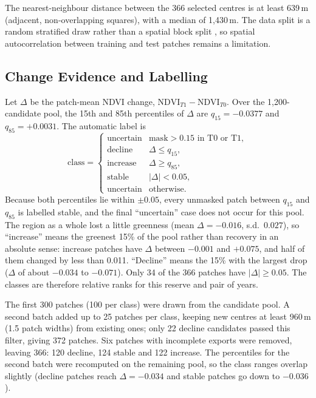\documentclass[11pt]{article}
\begin{document}
The nearest-neighbour distance between the 366 selected centres is at
least 639\,m (adjacent, non-overlapping squares), with a median of
1,430\,m. The data split is a random stratified draw rather than a
spatial block split \citep{ploton2020}, so spatial autocorrelation
between training and test patches remains a limitation.

\subsection{Change Evidence and Labelling}

Let $\Delta$ be the patch-mean NDVI change,
$\mathrm{NDVI}_{T1} - \mathrm{NDVI}_{T0}$. Over the 1,200-candidate
pool, the 15th and 85th percentiles of $\Delta$ are $q_{15} = -0.0377$
and $q_{85} = +0.0031$. The automatic label is
\begin{equation}
\mathrm{class} =
\begin{cases}
\text{uncertain} & \text{mask} > 0.15 \text{ in T0 or T1},\\
\text{decline} & \Delta \le q_{15},\\
\text{increase} & \Delta \ge q_{85},\\
\text{stable} & |\Delta| < 0.05,\\
\text{uncertain} & \text{otherwise}.
\end{cases}
\end{equation}
Because both percentiles lie within $\pm 0.05$, every unmasked patch
between $q_{15}$ and $q_{85}$ is labelled stable, and the final
``uncertain'' case does not occur for this pool. The region as a whole
lost a little greenness (mean $\Delta = -0.016$, s.d.\ $0.027$), so
``increase'' means the greenest 15\% of the pool rather than recovery in
an absolute sense: increase patches have $\Delta$ between $-0.001$ and
$+0.075$, and half of them changed by less than 0.011. ``Decline''
means the 15\% with the largest drop ($\Delta$ of about $-0.034$ to
$-0.071$). Only 34 of the 366 patches have $|\Delta| \ge 0.05$. The
classes are therefore relative ranks for this reserve and pair of
years.

The first 300 patches (100 per class) were drawn from the candidate
pool. A second batch added up to 25 patches per class, keeping new
centres at least 960\,m (1.5 patch widths) from existing ones; only 22
decline candidates passed this filter, giving 372 patches. Six patches
with incomplete exports were removed, leaving 366: 120 decline, 124
stable and 122 increase. The percentiles for the second batch were
recomputed on the remaining pool, so the class ranges overlap slightly
(decline patches reach $\Delta = -0.034$ and stable patches go down to
$-0.036$).
\end{document}
